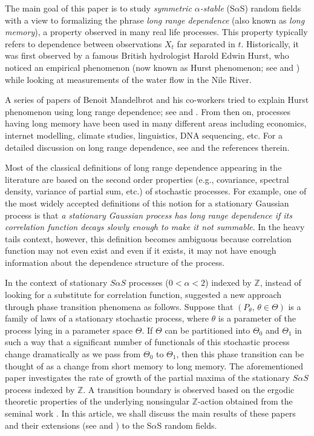 \documentclass[12pt]{amsart}
\begin{document}
The main goal of this paper is to study \emph{symmetric $\alpha$-stable} (S$\alpha$S) random fields with a view to formalizing the phrase \emph{long range dependence} (also known as \emph{long memory}), a property observed in many real life processes. This property typically refers to dependence between observations $X_t$ far separated in $t$. Historically, it was first
observed by a famous British hydrologist Harold Edwin Hurst, who
noticed an empirical phenomenon (now known as Hurst phenomenon; see
\cite{hurst:1951} and \cite{hurst:1955}) while looking at
measurements of the water flow in the Nile River.

A series of papers of Benoit Mandelbrot and his co-workers tried to
explain Hurst phenomenon using long range dependence; see \cite{mandelbrot:wallis:1968} and \cite{mandelbrot:wallis:1969c}.
From then on, processes having long memory have been used in many
different areas including economics, internet
modelling, climate studies, linguistics, DNA sequencing, etc. For a detailed discussion
on long range dependence, see \cite{samorodnitsky:2006} and the
references therein.

Most of the classical definitions
of long range dependence appearing in the literature are based on the
second order properties (e.g., covariance, spectral density,
variance of partial sum, etc.) of stochastic processes. For
example, one of the most widely accepted definitions of this notion for a stationary Gaussian process is that \emph{a stationary Gaussian process has long range dependence if its correlation function decays slowly enough to make it not
summable}.  In the heavy tails context, however, this definition
becomes ambiguous because correlation function may not even exist and even if it exists, it may not have enough
information about the dependence structure of the process.

In the context of stationary $S\alpha S$ processes ($0 < \alpha <
2$) indexed by $\mathbb{Z}$, instead of looking for a substitute for correlation function,
\cite{samorodnitsky:2004a} suggested a new approach through phase
transition phenomena as follows. Suppose that $(P_\theta,\,\theta
\in \Theta)$ is a family of laws of a stationary stochastic process,
where $\theta$ is a parameter of the process lying in a parameter
space $\Theta$. If $\Theta$ can be partitioned into $\Theta_0$ and
$\Theta_1$ in such a way that a significant number of functionals of this stochastic process change
dramatically as we pass from $\Theta_0$ to $\Theta_1$, then this
phase transition can be thought of as a change from short memory to
long memory. The aforementioned paper investigates the rate of growth of the partial maxima of the stationary $S\alpha S$ process indexed by $\mathbb{Z}$. A transition boundary is observed based on the
ergodic theoretic properties of the underlying nonsingular $\mathbb{Z}$-action obtained from the seminal work \cite{rosinski:1995}. In this article, we shall discuss the main results of these papers and their extensions (see \cite{rosinski:2000} and \cite{roy:samorodnitsky:2008}) to the S$\alpha$S random fields.
\end{document}
